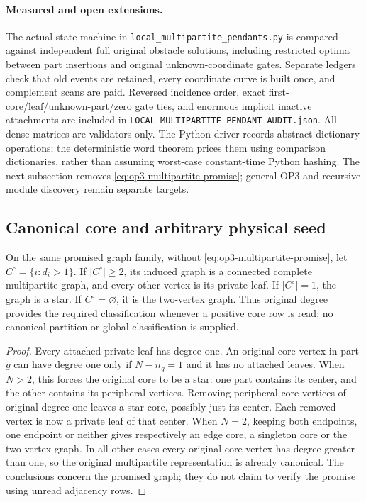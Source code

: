 \paragraph{Measured and open extensions.}
The actual state machine in \nolinkurl{local_multipartite_pendants.py}
is compared against independent full original obstacle solutions, including
restricted optima between part insertions and original unknown-coordinate
gates. Separate ledgers check that old events are retained, every coordinate
curve is built once, and complement scans are paid. Reversed incidence order,
exact first-core/leaf/unknown-part/zero gate ties, and enormous implicit
inactive attachments are included in
\nolinkurl{LOCAL_MULTIPARTITE_PENDANT_AUDIT.json}.
All dense matrices are validators only. The Python driver records abstract
dictionary operations; the deterministic word theorem prices them using
comparison dictionaries, rather than assuming worst-case constant-time
Python hashing. The next subsection removes
\cref{eq:op3-multipartite-promise}; general OP3 and recursive module
discovery remain separate \statusopen{} targets.

\subsection{Canonical core and arbitrary physical seed}
\label{sec:op3-canonical-multipartite}

\begin{lemma}
\label{lem:op3-canonical-core}
On the same promised graph family, without
\cref{eq:op3-multipartite-promise}, let
$C^\circ=\{i:d_i>1\}$. If $|C^\circ|\geq2$, its induced graph is a
connected complete multipartite graph, and every other vertex is its
private leaf. If $|C^\circ|=1$, the graph is a star. If
$C^\circ=\varnothing$, it is the two-vertex graph. Thus original degree
provides the required classification whenever a positive core row is read;
no canonical partition or global classification is supplied.
\end{lemma}
\begin{proof}
Every attached private leaf has degree one. An original core vertex in
part $g$ can have degree one only if $N-n_g=1$ and it has no attached
leaves. When $N>2$, this forces the original core to be a star: one part
contains its center, and the other contains its peripheral vertices.
Removing peripheral core vertices of original degree one leaves a star
core, possibly just its center. Each removed vertex is now a private leaf
of that center. When $N=2$, keeping both endpoints, one endpoint or neither
gives respectively an edge core, a singleton core or the two-vertex graph.
In all other cases every original core vertex has degree greater than one,
so the original multipartite representation is already canonical.
The conclusions concern the promised graph; they do not claim to verify
the promise using unread adjacency rows.
\end{proof}

